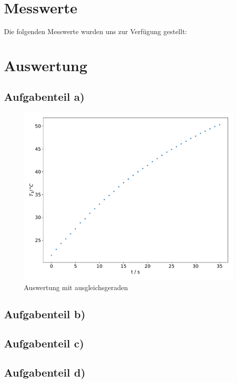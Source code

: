     \newpage
    \section{Messwerte}
    Die folgenden Messwerte wurden uns zur Verfügung gestellt:
    

    \newpage
    \section{Auswertung}
        \subsection{Aufgabenteil a)}
        \begin{figure}
               \centering
               \includegraphics[width=\textwidth]{grafic.pdf}
               \caption{Auswertung mit ausgleichsgeraden}
               \label{fig:grafic}
        \end{figure}


            

        \subsection{Aufgabenteil b)}


        \subsection{Aufgabenteil c)}


        \subsection{Aufgabenteil d)}


